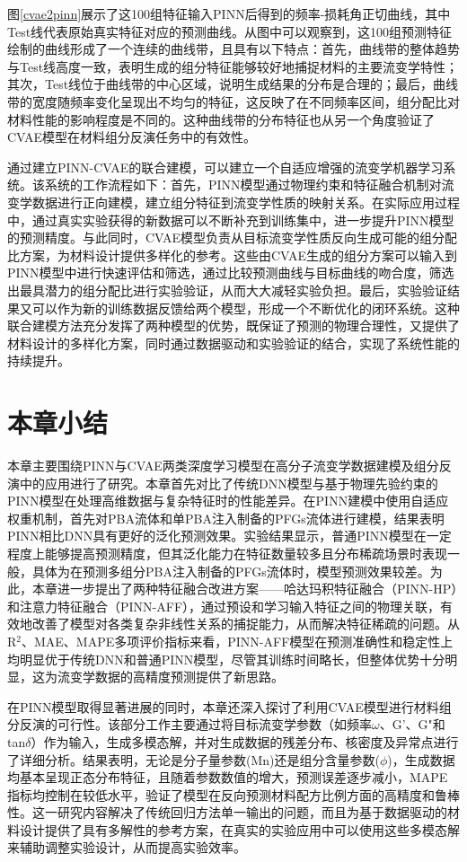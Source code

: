 图\ref{cvae2pinn}展示了这100组特征输入PINN后得到的频率-损耗角正切曲线，其中Test线代表原始真实特征对应的预测曲线。从图中可以观察到，这100组预测特征绘制的曲线形成了一个连续的曲线带，且具有以下特点：首先，曲线带的整体趋势与Test线高度一致，表明生成的组分特征能够较好地捕捉材料的主要流变学特性；其次，Test线位于曲线带的中心区域，说明生成结果的分布是合理的；最后，曲线带的宽度随频率变化呈现出不均匀的特征，这反映了在不同频率区间，组分配比对材料性能的影响程度是不同的。这种曲线带的分布特征也从另一个角度验证了CVAE模型在材料组分反演任务中的有效性。

通过建立PINN-CVAE的联合建模，可以建立一个自适应增强的流变学机器学习系统。该系统的工作流程如下：首先，PINN模型通过物理约束和特征融合机制对流变学数据进行正向建模，建立组分特征到流变学性质的映射关系。在实际应用过程中，通过真实实验获得的新数据可以不断补充到训练集中，进一步提升PINN模型的预测精度。与此同时，CVAE模型负责从目标流变学性质反向生成可能的组分配比方案，为材料设计提供多样化的参考。这些由CVAE生成的组分方案可以输入到PINN模型中进行快速评估和筛选，通过比较预测曲线与目标曲线的吻合度，筛选出最具潜力的组分配比进行实验验证，从而大大减轻实验负担。最后，实验验证结果又可以作为新的训练数据反馈给两个模型，形成一个不断优化的闭环系统。这种联合建模方法充分发挥了两种模型的优势，既保证了预测的物理合理性，又提供了材料设计的多样化方案，同时通过数据驱动和实验验证的结合，实现了系统性能的持续提升。

\section{本章小结}
本章主要围绕PINN与CVAE两类深度学习模型在高分子流变学数据建模及组分反演中的应用进行了研究。本章首先对比了传统DNN模型与基于物理先验约束的PINN模型在处理高维数据与复杂特征时的性能差异。在PINN建模中使用自适应权重机制，首先对PBA流体和单PBA注入制备的PFGs流体进行建模，结果表明PINN相比DNN具有更好的泛化预测效果。实验结果显示，普通PINN模型在一定程度上能够提高预测精度，但其泛化能力在特征数量较多且分布稀疏场景时表现一般，具体为在预测多组分PBA注入制备的PFGs流体时，模型预测效果较差。为此，本章进一步提出了两种特征融合改进方案——哈达玛积特征融合（PINN-HP）和注意力特征融合（PINN-AFF），通过预设和学习输入特征之间的物理关联，有效地改善了模型对各类复杂非线性关系的捕捉能力，从而解决特征稀疏的问题。从R$^2$、MAE、MAPE多项评价指标来看，PINN-AFF模型在预测准确性和稳定性上均明显优于传统DNN和普通PINN模型，尽管其训练时间略长，但整体优势十分明显，这为流变学数据的高精度预测提供了新思路。

在PINN模型取得显著进展的同时，本章还深入探讨了利用CVAE模型进行材料组分反演的可行性。该部分工作主要通过将目标流变学参数（如频率$\omega$、G'、G"和tan$\delta$）作为输入，生成多模态解，并对生成数据的残差分布、核密度及异常点进行了详细分析。结果表明，无论是分子量参数(Mn)还是组分含量参数($\phi$)，生成数据均基本呈现正态分布特征，且随着参数数值的增大，预测误差逐步减小，MAPE指标均控制在较低水平，验证了模型在反向预测材料配方比例方面的高精度和鲁棒性。这一研究内容解决了传统回归方法单一输出的问题，而且为基于数据驱动的材料设计提供了具有多解性的参考方案，在真实的实验应用中可以使用这些多模态解来辅助调整实验设计，从而提高实验效率。


